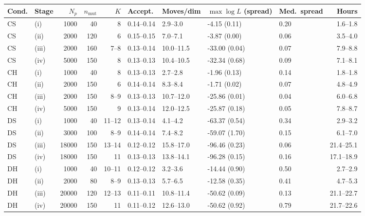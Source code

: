 \begin{tabular}{llrrrllllr}\toprule
Cond. & Stage & $N_p$ & $n_{\mathrm{mut}}$ & $K$ & Accept. & Moves/dim & $\max\log L$ (spread) & Med.\ spread & Hours\\
\midrule
CS & (i) & 1000 & 40 & 8 & 0.14--0.14 & 2.9--3.0 & -4.15 (0.11) & 0.20 & 1.6--1.8\\
CS & (ii) & 2000 & 120 & 6 & 0.15--0.15 & 7.0--7.1 & -3.87 (0.00) & 0.06 & 3.5--4.0\\
CS & (iii) & 2000 & 160 & 7--8 & 0.13--0.14 & 10.0--11.5 & -33.00 (0.04) & 0.07 & 7.9--8.8\\
CS & (iv) & 5000 & 150 & 8 & 0.13--0.13 & 10.4--10.5 & -32.34 (0.68) & 0.09 & 7.1--8.1\\
CH & (i) & 1000 & 40 & 8 & 0.13--0.13 & 2.7--2.8 & -1.96 (0.13) & 0.14 & 1.8--1.8\\
CH & (ii) & 2000 & 150 & 6 & 0.14--0.14 & 8.3--8.4 & -1.71 (0.02) & 0.07 & 4.8--4.9\\
CH & (iii) & 2000 & 150 & 8--9 & 0.13--0.13 & 10.7--12.0 & -25.86 (0.01) & 0.04 & 6.0--6.8\\
CH & (iv) & 5000 & 150 & 9 & 0.13--0.14 & 12.0--12.5 & -25.87 (0.18) & 0.05 & 7.8--8.7\\
DS & (i) & 1000 & 40 & 11--12 & 0.13--0.14 & 4.1--4.2 & -63.37 (0.54) & 0.34 & 2.9--3.2\\
DS & (ii) & 3000 & 100 & 8--9 & 0.14--0.14 & 7.4--8.2 & -59.07 (1.70) & 0.15 & 6.1--7.0\\
DS & (iii) & 18000 & 150 & 13--14 & 0.12--0.12 & 15.8--17.0 & -96.46 (0.23) & 0.06 & 21.4--25.1\\
DS & (iv) & 18000 & 150 & 11 & 0.13--0.13 & 13.8--14.1 & -96.28 (0.15) & 0.16 & 17.1--18.9\\
DH & (i) & 1000 & 40 & 10--11 & 0.12--0.12 & 3.2--3.6 & -14.44 (0.90) & 0.50 & 2.7--2.9\\
DH & (ii) & 2000 & 80 & 8--9 & 0.13--0.13 & 5.7--6.5 & -12.58 (0.35) & 0.41 & 4.7--5.3\\
DH & (iii) & 20000 & 120 & 12--13 & 0.11--0.11 & 10.8--11.4 & -50.62 (0.09) & 0.13 & 21.1--22.7\\
DH & (iv) & 20000 & 150 & 11 & 0.11--0.12 & 12.6--13.0 & -50.62 (0.92) & 0.79 & 21.7--22.6\\
\bottomrule\end{tabular}
